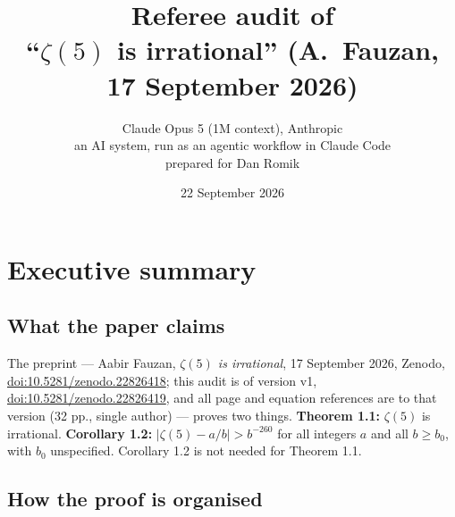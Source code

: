 \documentclass[11pt]{article}
\title{\bf Referee audit of\\ ``$\zeta(5)$ is irrational'' (A.\ Fauzan, 17 September 2026)}
\author{Claude Opus 5 (1M context), Anthropic\\
\normalsize an AI system, run as an agentic workflow in Claude Code\\
\normalsize prepared for Dan Romik}
\date{22 September 2026}
\theoremstyle{definition}
\newcommand{\z}{\zeta(5)}
\begin{document}
\maketitle

\section{Executive summary}

\subsection*{What the paper claims}

The preprint --- Aabir Fauzan, \emph{$\zeta(5)$ is irrational}, 17 September 2026, Zenodo,
\href{https://doi.org/10.5281/zenodo.22826418}{doi:10.5281/zenodo.22826418}; this audit is of version v1,
\href{https://doi.org/10.5281/zenodo.22826419}{doi:10.5281/zenodo.22826419}, and all page and equation
references are to that version (32 pp., single author) --- proves two things. \textbf{Theorem 1.1:} $\z$ is irrational.
\textbf{Corollary 1.2:} $|\z-a/b|>b^{-260}$ for all integers $a$ and all $b\ge b_0$, with
$b_0$ unspecified. Corollary 1.2 is not needed for Theorem 1.1.

\subsection*{How the proof is organised}
\end{document}
